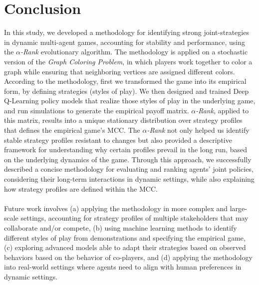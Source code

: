 \section{Conclusion}

\begin{flushleft}

    In this study, we developed a methodology for identifying strong joint-strategies in dynamic multi-agent games, accounting for stability and performance, using the \emph{$\alpha$-Rank} evolutionary algorithm. The methodology is applied on a stochastic version of the \emph{Graph Coloring Problem}, in which players work together to color a graph while ensuring that neighboring vertices are assigned different colors. According to the methodology, first we transformed the game into its empirical form, by defining strategies (styles of play). We then designed and trained Deep Q-Learning policy models that realize those styles of play in the underlying game, and run simulations to generate the empirical payoff matrix. \emph{$\alpha$-Rank}, applied to this matrix, results into a unique stationary distribution over strategy profiles that defines the empirical game's MCC. The \emph{$\alpha$-Rank} not only helped us identify stable strategy profiles resistant to changes but also provided a descriptive framework for understanding why certain profiles prevail in the long run, based on the underlying dynamics of the game. Through this approach, we successfully described a concise methodology for evaluating and ranking agents' joint policies, considering their long-term interactions in dynamic settings, while also explaining how strategy profiles are defined within the MCC.\\~\\

    Future work involves (a) applying the methodology in more complex and large-scale settings, accounting for strategy profiles of multiple stakeholders that may collaborate and/or compete, (b) using machine learning methods to identify different styles of play from demonstrations and specifying the empirical game, (c) exploring advanced models able to adapt their strategies based on observed behaviors based on the behavior of co-players, and (d) applying the methodology into real-world settings where agents need to align with human preferences in dynamic settings.

\end{flushleft}